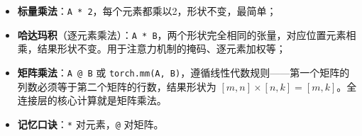 \documentclass[a4paper,11pt]{ctexart}
\begin{document}
\begin{beginnerbox}
    \begin{itemize}
        \item \textbf{标量乘法}：\texttt{A * 2}，每个元素都乘以2，形状不变，最简单；
        \item \textbf{哈达玛积}（逐元素乘法）：\texttt{A * B}，两个形状完全相同的张量，对应位置元素相乘，结果形状不变。用于注意力机制的掩码、逐元素加权等；
        \item \textbf{矩阵乘法}：\texttt{A @ B} 或 \texttt{torch.mm(A, B)}，遵循线性代数规则——第一个矩阵的列数必须等于第二个矩阵的行数，结果形状为 $[m, n] \times [n, k] = [m, k]$。全连接层的核心计算就是矩阵乘法。
        \item \textbf{记忆口诀}：\texttt{*} 对元素，\texttt{@} 对矩阵。
    \end{itemize}
\end{beginnerbox}
\end{document}
